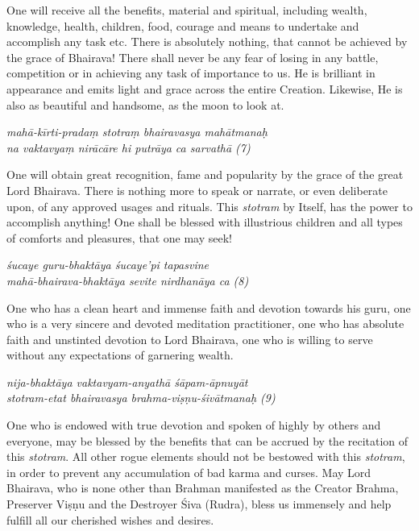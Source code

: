 \documentclass[12pt,oneside,a4paper]{article}
\newenvironment{shloka}[1]
  {\bigskip\center#1\varwidth{\linewidth}}
  {\endvarwidth\endcenter\bigskip}
\newcommand{\tl}[1]{\emph{#1}}
\begin{document}
One will receive all the benefits, material and spiritual, including wealth,
knowledge, health, children, food, courage and means to undertake and accomplish
any task etc. There is absolutely nothing, that cannot be achieved by the grace
of Bhairava! There shall never be any fear of losing in any battle, competition
or in achieving any task of importance to us. He is brilliant in appearance and
emits light and grace across the entire Creation. Likewise, He is also as
beautiful and handsome, as the moon to look at.

\begin{shloka}\itshape
  mahā-kīrti-pradaṃ stotraṃ bhairavasya mahātmanaḥ\\
  na vaktavyaṃ nirācāre hi putrāya ca sarvathā (7)
\end{shloka}

One will obtain great recognition, fame and popularity by the grace of the great
Lord Bhairava. There is nothing more to speak or narrate, or even deliberate
upon, of any approved usages and rituals. This \tl{stotram} by Itself, has
the power to accomplish anything! One shall be blessed with illustrious children
and all types of comforts and pleasures, that one may seek!

\begin{shloka}\itshape
  śucaye guru-bhaktāya śucaye'pi tapasvine\\
  mahā-bhairava-bhaktāya sevite nirdhanāya ca (8)
\end{shloka}

One who has a clean heart and immense faith and devotion towards his guru,
one who is a very sincere and devoted meditation practitioner, one who has
absolute faith and unstinted devotion to Lord Bhairava, one who is willing to
serve without any expectations of garnering wealth.

\begin{shloka}\itshape
  nija-bhaktāya vaktavyam-anyathā śāpam-āpnuyāt\\
  stotram-etat bhairavasya brahma-viṣṇu-śivātmanaḥ (9)
\end{shloka}

One who is endowed with true devotion and spoken of highly by others and
everyone, may be blessed by the benefits that can be accrued by the recitation
of this \tl{stotram}. All other rogue elements should not be bestowed with this
\tl{stotram}, in order to prevent any accumulation of bad karma and curses.
May Lord Bhairava, who is none other than Brahman manifested as the Creator
Brahma, Preserver Viṣṇu and the Destroyer Śiva (Rudra), bless us immensely and
help fulfill all our cherished wishes and desires.
\end{document}

